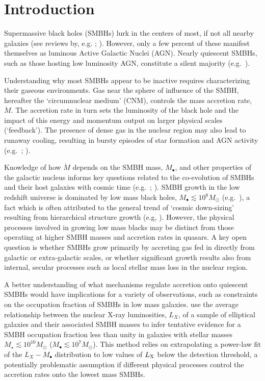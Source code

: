 \documentclass[usenatbib,fleqn]{mn2e}
\newcommand{\Mbh}[1][]{M_{\bullet#1}}
\begin{document}
\section{Introduction}
\label{sec:introduction}

Supermassive black holes (SMBHs) lurk in the centers of most, if not
all nearby galaxies (see reviews by,
e.g. \citealt{KormendyRichstone:1995a};
\citealt{FerrareseFord:2005a}). However, only a few percent of these
manifest themselves as luminous Active Galactic Nuclei (AGN).  Nearly
quiescent SMBHs, such as those hosting low luminosity AGN, constitute
a silent majority (e.g.~\citealt{Ho:2009a}).

Understanding why most SMBHs appear to be inactive requires
characterizing their gaseous environments.  Gas near the sphere of
influence of the SMBH, hereafter the `circumnuclear medium' (CNM),
controls the mass accretion rate, $\dot{M}$.  The accretion rate in
turn sets the luminosity of the black hole and the impact of this
energy and momentum output on larger physical scales (`feedback').
The presence of dense gas in the nuclear region may also lead to runaway
cooling, resulting in bursty episodes of star formation and AGN
activity (e.g.~\citealt{Ciotti&Ostriker07}; \citealt{Ciotti+10}).

Knowledge of how $\dot{M}$ depends on the SMBH mass, $\Mbh$, and other
properties of the galactic nucleus informs key questions related to
the co-evolution of SMBHs and their host galaxies with cosmic time
(e.g.~\citealt{Kormendy&Ho13}; \citealt{HeckmanBest:2014a}).  SMBH growth
in the low redshift universe is dominated by low mass black holes,
$M_{\bullet} \lesssim 10^{8}M_{\odot}$ (e.g.~\citealt{Heckman+04}), a
fact which is often attributed to the general trend of `cosmic
down-sizing' resulting from hierarchical structure growth (e.g,
\citealt{Gallo+08}).  However, the physical processes involved in
growing low mass blacks may be distinct from those operating at higher
SMBH masses and accretion rates in quasars.  A key open question is
whether SMBHs grow primarily by accreting gas fed in directly from
galactic or extra-galactic scales, or whether significant growth
results also from internal, secular processes such as local stellar
mass loss in the nuclear region.

A better understanding of what mechanisms regulate accretion onto
quiescent SMBHs would have implications for a variety of observations,
such as constraints on the occupation fraction of SMBHs in low mass
galaxies.  \citet{Miller+15} use the average relationship between the
nuclear X-ray luminosities, $L_{X}$, of a sample of elliptical
galaxies and their associated SMBH masses to infer tentative evidence for a
SMBH occupation fraction less than unity in galaxies with stellar
masses $M_{\star} \lesssim 10^{10}M_{\odot}$ ($M_{\bullet} \lesssim
10^{7}M_{\odot}$).  This method relies on extrapolating a power-law
fit of the $L_X-\Mbh$ distribution to low values of $L_{\rm X}$ below
the detection threshold, a potentially problematic assumption if
different physical processes control the accretion rates onto the
lowest mass SMBHs.
\end{document}
